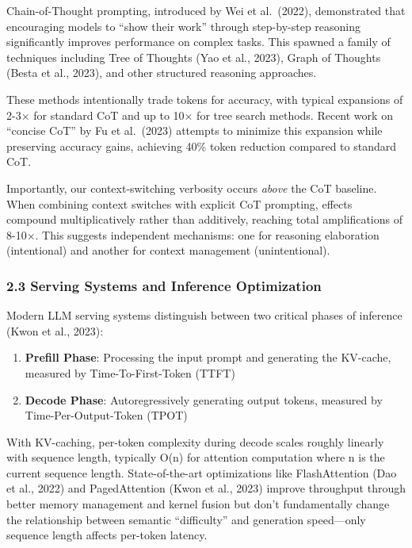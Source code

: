 \documentclass[
  11pt]{article}
\providecommand{\tightlist}{%
  \setlength{\itemsep}{0pt}\setlength{\parskip}{0pt}}
\begin{document}
Chain-of-Thought prompting, introduced by Wei et al.~(2022),
demonstrated that encouraging models to ``show their work'' through
step-by-step reasoning significantly improves performance on complex
tasks. This spawned a family of techniques including Tree of Thoughts
(Yao et al., 2023), Graph of Thoughts (Besta et al., 2023), and other
structured reasoning approaches.

These methods intentionally trade tokens for accuracy, with typical
expansions of 2-3× for standard CoT and up to 10× for tree search
methods. Recent work on ``concise CoT'' by Fu et al.~(2023) attempts to
minimize this expansion while preserving accuracy gains, achieving 40\%
token reduction compared to standard CoT.

Importantly, our context-switching verbosity occurs \emph{above} the CoT
baseline. When combining context switches with explicit CoT prompting,
effects compound multiplicatively rather than additively, reaching total
amplifications of 8-10×. This suggests independent mechanisms: one for
reasoning elaboration (intentional) and another for context management
(unintentional).

\subsubsection{2.3 Serving Systems and Inference
Optimization}\label{serving-systems-and-inference-optimization}

Modern LLM serving systems distinguish between two critical phases of
inference (Kwon et al., 2023):

\begin{enumerate}
\def\labelenumi{\arabic{enumi}.}
\tightlist
\item
  \textbf{Prefill Phase}: Processing the input prompt and generating the
  KV-cache, measured by Time-To-First-Token (TTFT)
\item
  \textbf{Decode Phase}: Autoregressively generating output tokens,
  measured by Time-Per-Output-Token (TPOT)
\end{enumerate}

With KV-caching, per-token complexity during decode scales roughly
linearly with sequence length, typically O(n) for attention computation
where n is the current sequence length. State-of-the-art optimizations
like FlashAttention (Dao et al., 2022) and PagedAttention (Kwon et al.,
2023) improve throughput through better memory management and kernel
fusion but don't fundamentally change the relationship between semantic
``difficulty'' and generation speed---only sequence length affects
per-token latency.
\end{document}
